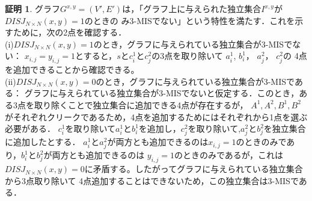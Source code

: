 \documentclass[12pt]{thesis}
\theoremstyle{definition}
\newtheorem*{prf*}{証明}
\begin{document}
\begin{prf*}
グラフ$G^{x, y} = (V', E')$は，「グラフ上に与えられた独立集合$I^{x,y}$が$DISJ_{N \times N} (x, y) = 1$のときの
み3-MISでない」という特性を満たす．これを示すために，次の2点を確認する． \\
(i)$DISJ_{N \times N} (x, y) = 1$のとき，グラフに与えられている独立集合が3-MISでない： 
$x_{i, j} = y_{i, j} =1$とすると，$s$と$c_{i}^{1}$と$c_{j}^{2}$の3点を取り除いて
$a_{i}^{1}$, $b_{i}^{1}$， $a_{j}^{2}$， $c_{j}^{2}$の
4点を追加できることから確認できる。 \\
(ii)$DISJ_{N \times N} (x, y) = 0$のとき，グラフに与えられている独立集合が3-MISである： 
グラフに与えられている独立集合が3-MISでないと仮定する．このとき，ある3点を取り除くことで独立集合に追加できる4点が存在するが，
$A^{1}, A^{2}, B^{1}, B^{2}$がそれぞれクリークであるため，4点を追加するためにはそれぞれから1点を選ぶ必要がある．
$c_{i}^{1}$を取り除いて$a_{i}^{1}$と$b_{i}^{1}$を追加し，$c_{j}^{2}$を取り除いて,$a_{j}^{2}$と$b_{j}^{2}$を独立集合に追加したとする．
$a_{i}^{1}$と$a_{j}^{2}$が両方とも追加できるのは$x_{i, j} = 1$のときのみであり，$b_{i}^{1}$と$b_{j}^{2}$が両方とも追加できるのは
$y_{i, j} = 1$のときのみであるが，これは$DISJ_{N \times N} (x, y) = 0$に矛盾する。したがってグラフに与えられている独立集合から3点取り除いて
4点追加することはできないため，この独立集合は3-MISである．


\end{prf*}
\end{document}
